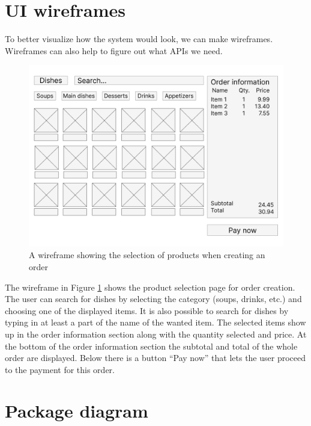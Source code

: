 \documentclass[11pt,a4paper,pdftex]{article}
\begin{document}
\section{UI wireframes}
To better visualize how the system would look, we can make wireframes. Wireframes can also help to figure out what APIs we need.

\begin{figure}[H]
    \centering
    \includegraphics[width=1\linewidth]{ProductSelection.png}
    \caption{A wireframe showing the selection of products when creating an order}
    \label{fig:wireframe_product_selection}
\end{figure}

The wireframe in Figure \ref{fig:wireframe_product_selection} shows the product selection page for order creation. The user can search for dishes by selecting the category (soups, drinks, etc.) and choosing one of the displayed items. It is also possible to search for dishes by typing in at least a part of the name of the wanted item. The selected items show up in the order information section along with the quantity selected and price. At the bottom of the order information section the subtotal and total of the whole order are displayed. Below there is a button \enquote{Pay now} that lets the user proceed to the payment for this order.


\section{Package diagram}
\end{document}
